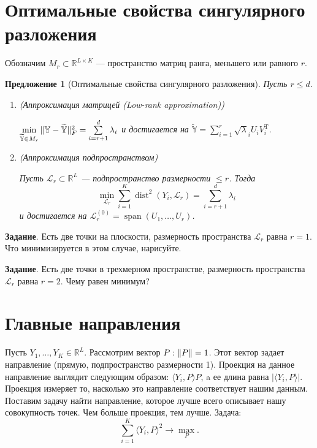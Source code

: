\documentclass[specialist, 12pt,
subf, %
href, colorlinks=true,
substylefile = spbu.rtx,
]{disser}
\newtheorem{proposition}{Предложение}
\DeclareMathOperator{\spn}{span}
\DeclareMathOperator{\dist}{dist}
\begin{document}
\section{Оптимальные свойства сингулярного разложения}
Обозначим $M_r \subset \mathbb{R}^{L\times K}$ --- пространство матриц ранга, меньшего или равного $r$.
\begin{proposition}[Оптимальные свойства сингулярного разложения]
	Пусть $r\le d$.
	\begin{enumerate}
		\item (Аппроксимация матрицей (Low-rank approximation))
		
		$\min \limits_{\widetilde{\mathbb{Y}}\in M_r} \Arrowvert \mathbb{Y} - \widetilde{\mathbb{Y}}\Arrowvert^2_F =\sum\limits_{i =r+1}^d \lambda_i $ и достигается на $\widetilde{\mathbb{Y}}=\sum\limits_{i =1}^r \sqrt \lambda_i U_i V_i^\mathrm{T}.$
		\item (Аппроксимация подпространством)
		
		Пусть $\mathcal{L}_r \subset \mathbb{R}^L$ --- подпространство размерности $\le r$. Тогда
		\begin{equation*}
		\min\limits_{\mathcal{L}_r} \sum \limits_{i =1}^K \dist^2(Y_i,\mathcal{L}_r)=\sum \limits_{i =r+1}^d \lambda_i
		\end{equation*}
		и достигается на $\mathcal{L}_r^{(0)}=\spn (U_1,\ldots,U_r)$.
	\end{enumerate}
\end{proposition}

\textbf{Задание}. Есть две точки на плоскости, размерность пространства $\mathcal{L}_r$ равна $r=1$. Что минимизируется в этом случае, нарисуйте.

\textbf{Задание}. Есть две точки в трехмерном пространстве, размерность пространства $\mathcal{L}_r$ равна $r=2$. Чему равен минимум?



\section{Главные направления}
Пусть $Y_1,\ldots,Y_K\in \mathbb{R}^L$. Рассмотрим вектор $P: \Arrowvert P \Arrowvert =1$. Этот вектор задает направление (прямую, подпространство размерности 1). Проекция на данное направление выглядит следующим образом: $\langle Y_i,P\rangle P$, a ее длина равна $|\langle Y_i,P\rangle|$. Проекция измеряет то, насколько это направление соответствует нашим данным.
Поставим задачу найти направление, которое лучше всего описывает нашу совокупность точек. Чем больше проекция, тем лучше. Задача:
\begin{equation*}
\sum\limits_{i =1}^K \langle Y_i,P\rangle ^2 \to \max\limits_P.
\end{equation*}
\end{document}
